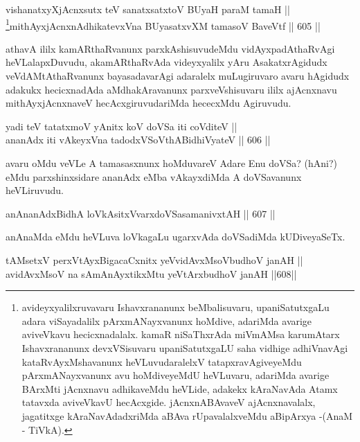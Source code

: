 \begin{shl}
vishanatxyXjAcnxsutx teV sanatxsatxtoV BUyaH paraM tamaH || \\
\footnote{avideyxyalilxruvavaru Ishavxrananunx beMbalisuvaru, upaniSatutxgaLu adara viSayadalilx pArxmANayxvanunx hoMdive, adariMda avarige aviveVkavu hecicxnadalalx. kamaR niSaThxrAda miVmAMsa karumAtarx Ishavxrananunx devxVSisuvaru upaniSatutxgaLU saha vidhige adhiVnavAgi kataRvAyxMshavanunx heVLuvudaralelxV tatapxravAgiveyeMdu pArxmANayxvanunx avu hoMdiveyeMdU heVLuvaru, adariMda avarige BArxMti jAcnxnavu adhikaveMdu heVLide, adakekx kAraNavAda Atamx tatavxda aviveVkavU hecAcxgide. jAcnxnABAvaveV ajAcnxnavalalx, jagatitxge kAraNavAdadxriMda aBAva rUpavalalxveMdu aBipArxya -\break (AnaM - TiVkA).}mithAyxjAcnxnAdhikatevxVna BUyasatxvXM tamasoV BaveVtf \hfill || 605 ||
\end{shl}


\begin{artha}
athavA ililx kamARthaRvanunx parxkAshisuvudeMdu vidAyxpadAthaRvAgi
heVLalapxDuvudu, akamARthaRvAda videyxyalilx yAru AsakatxrAgidudx
veVdAMtAthaRvanunx bayasadavarAgi adaralelx  muLugiruvaro avaru
hAgidudx adakukx hecicxnadAda aMdhakAravanunx parxveVshisu\-varu ililx
ajAcnxnavu mithAyxjAcnxnaveV hecAcxgiruvudariMda hececxMdu Agiruvudu.
\end{artha}

\begin{shl}
yadi teV tatatxmoV yAnitx koV doVSa iti coVditeV || \\
ananAdx iti vAkeyxVna tadodxVSoV\s thABidhiVyateV \hfill || 606 ||  
\end{shl}

\begin{artha}
avaru oMdu veVLe A tamasasxnunx hoMduvareV Adare Enu doVSa? (hAni?)
eMdu parxshinxsidare ananAdx eMba vAkayxdiMda A doVSavanunx heVLiruvudu.
\end{artha}

\begin{shl}
anAnanAdxBidhA loVkAsitxVvarxdoVSasamanivxtAH \hfill || 607 || 
\end{shl}

\begin{artha}
anAnaMda eMdu heVLuva loVkagaLu ugarxvAda doVSadiMda kUDiveyaSeTx.
\end{artha}

\begin{shl}
tAMsetxV perxVtAyxBigacaCxnitx yeV\s vidAvxMsoV\s budhoV janAH || \\
avidAvxMsoV na sAmAnAyxtikxMtu yeV\s tArxbudhoV janAH \hfill ||608|| 
\end{shl}

